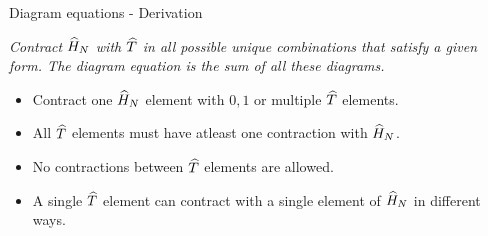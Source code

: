 \begin{frame}{Diagram equations - Derivation}

    \emph{Contract $\widehat{H}_N$ with $\widehat{T}$ in all possible unique combinations that satisfy a given form. The diagram equation is the sum of all these diagrams.}

    \pause
    \begin{itemize}
        \item Contract one $\widehat{H}_N$ element with $0,1$ or multiple $\widehat{T}$ elements. \pause
        \item All $\widehat{T}$ elements must have \alert{atleast} one contraction with $\widehat{H}_N$. \pause
        \item No contractions between $\widehat{T}$ elements are allowed. \pause
        \item A single $\widehat{T}$ element can contract with a single element of $\widehat{H}_N$ in different ways.
    \end{itemize}
\end{frame}

    
